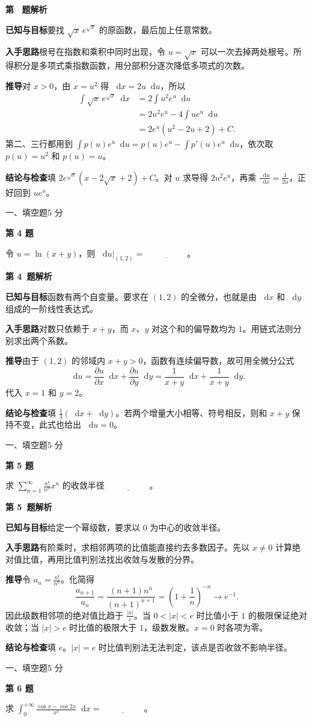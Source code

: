 \documentclass[UTF8,zihao=-4,fontset=fandol]{ctexart}
\newcommand{\dd}{\mathop{}\!\mathrm{d}}
\newcommand{\blank}{\underline{\hspace{5em}}}
\newcommand{\Question}[3]{%
  \clearpage
  \def\CurrentNumber{#1}%
  \pdfbookmark[1]{第 #1 题}{q#1}%
  {\small #2\hfill #3 分}\par\medskip
  {\Large\bfseries 第 #1 题}\par\medskip
  \fontsize{14}{22}\selectfont
}
\newcommand{\Solution}{%
  \clearpage
  \fontsize{12}{18}\selectfont
  {\large\bfseries 第 \CurrentNumber\ 题解析}\par\smallskip
}
\newcommand{\Known}{\par\textbf{已知与目标}\quad}
\newcommand{\Method}{\par\textbf{入手思路}\quad}
\newcommand{\Derive}{\par\textbf{推导}\quad}
\newcommand{\Verify}{\par\textbf{结论与检查}\quad}
\begin{document}
\Solution
\Known 要找 $\sqrt{x}\,e^{\sqrt{x}}$ 的原函数，最后加上任意常数。
\Method 根号在指数和乘积中同时出现，令 $u=\sqrt{x}$ 可以一次去掉两处根号。所得积分是多项式乘指数函数，用分部积分逐次降低多项式的次数。
\Derive 对 $x>0$，由 $x=u^2$ 得 $\dd x=2u\dd u$，所以
\[
\begin{aligned}
\int\sqrt{x}\,e^{\sqrt{x}}\dd x
&=2\int u^2e^u\dd u\\
&=2u^2e^u-4\int u e^u\dd u\\
&=2e^u(u^2-2u+2)+C.
\end{aligned}
\]
第二、三行都用到 $\int p(u)e^u\dd u=p(u)e^u-\int p'(u)e^u\dd u$，依次取 $p(u)=u^2$ 和 $p(u)=u$。
\Verify 填 $\boxed{2e^{\sqrt{x}}(x-2\sqrt{x}+2)+C}$。对 $u$ 求导得 $2u^2e^u$，再乘 $\frac{\dd u}{\dd x}=\frac{1}{2u}$，正好回到 $u e^u$。

\Question{4}{一、填空题}{5}
令 $u=\ln(x+y)$，则 $\left.\dd u\right|_{(1,2)}=\blank$。

\Solution
\Known 函数有两个自变量。要求在 $(1,2)$ 的全微分，也就是由 $\dd x$ 和 $\dd y$ 组成的一阶线性表达式。
\Method 对数只依赖于 $x+y$，而 $x$、$y$ 对这个和的偏导数均为 $1$。用链式法则分别求出两个系数。
\Derive 由于 $(1,2)$ 的邻域内 $x+y>0$，函数有连续偏导数，故可用全微分公式
\[
\dd u=\frac{\partial u}{\partial x}\dd x+\frac{\partial u}{\partial y}\dd y
=\frac{1}{x+y}\dd x+\frac{1}{x+y}\dd y.
\]
代入 $x=1$ 和 $y=2$。
\Verify 填 $\boxed{\frac{1}{3}(\dd x+\dd y)}$。若两个增量大小相等、符号相反，则和 $x+y$ 保持不变，此式也给出 $\dd u=0$。

\Question{5}{一、填空题}{5}
求 $\displaystyle\sum_{n=1}^{\infty}\frac{n!}{n^n}x^n$ 的收敛半径 $\blank$。

\Solution
\Known 给定一个幂级数，要求以 $0$ 为中心的收敛半径。
\Method 有阶乘时，求相邻两项的比值能直接约去多数因子。先以 $x\ne 0$ 计算绝对值比值，再用比值判别法找出收敛与发散的分界。
\Derive 令 $a_n=\frac{n!}{n^n}$。化简得
\[
\frac{a_{n+1}}{a_n}
=\frac{(n+1)n^n}{(n+1)^{n+1}}
=\left(1+\frac1n\right)^{-n}
\longrightarrow e^{-1}.
\]
因此级数相邻项的绝对值比趋于 $\frac{|x|}{e}$。当 $0<|x|<e$ 时比值小于 $1$ 的极限保证绝对收敛；当 $|x|>e$ 时比值的极限大于 $1$，级数发散。$x=0$ 时各项为零。
\Verify 填 $\boxed{e}$。$|x|=e$ 时比值判别法无法判定，该点是否收敛不影响半径。

\Question{6}{一、填空题}{5}
求 $\displaystyle\int_0^{+\infty}\frac{\cos x-\cos 2x}{x^2}\dd x=\blank$。
\end{document}
